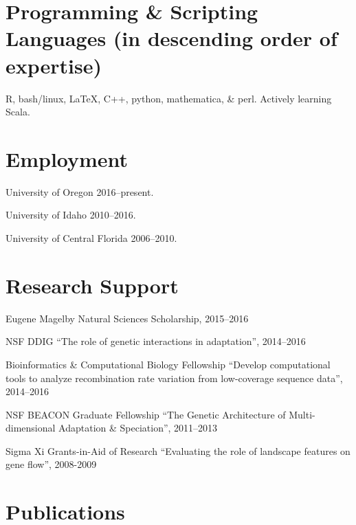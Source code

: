 \documentclass[letterpaper]{article}
\renewenvironment{itemize}{
  \begin{list}{}{
    \setlength{\leftmargin}{1.5em}
  }
}{
  \end{list}
}
\begin{document}
\section*{Programming \& Scripting Languages (in descending order of expertise)}
\begin{itemize}
\item R, bash/linux, \LaTeX, C++, python, mathematica, \& perl. Actively learning Scala.
\end{itemize}

\section*{Employment}

\begin{itemize}
\item University of Oregon 2016--present.
\item University of Idaho 2010--2016.
\item University of Central Florida 2006--2010.
\end{itemize}

\section*{Research Support}
\begin{itemize}
\item Eugene Magelby Natural Sciences Scholarship, 2015--2016
\item NSF DDIG ``The role of genetic interactions in adaptation'', 2014--2016
\item Bioinformatics \& Computational Biology Fellowship ``Develop computational tools to analyze recombination rate variation from low-coverage sequence data'', 2014--2016
\item NSF BEACON Graduate Fellowship ``The Genetic Architecture of Multi-dimensional Adaptation \& Speciation'', 2011--2013
\item Sigma Xi Grants-in-Aid of Research ``Evaluating the role of landscape features on gene flow'', 2008-2009
\end{itemize}


\section*{Publications}
\end{document}
